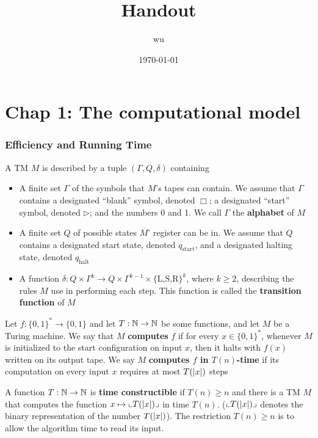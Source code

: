 \documentclass[11pt]{article}
\author{wu}
\date{\today}
\title{Handout}
\def \start {\text{start}}
\def \halt {\text{halt}}
\begin{document}
\maketitle
\tableofcontents

\section{Chap 1: The computational model}
\label{sec:org0fc5794}

\subsubsection{Efficiency and Running Time}
\label{sec:org3b71a53}
\begin{definition}[]
A TM \(M\) is described by a tuple \((\Gamma,Q,\delta)\) containing
\begin{itemize}
\item A finite set \(\Gamma\) of the symbols that \(M\)'s tapes can contain. We assume that \(\Gamma\) contains a
designated ``blank'' symbol, denoted \(\Box\); a designated ``start'' symbol, denoted \(\rhd\);
and the numbers 0 and 1. We call \(\Gamma\) the \textbf{alphabet} of \(M\)
\item A finite set \(Q\) of possible states \(M\)' register can be in. We assume that \(Q\) contains
a designated start state, denoted \(q_{\start}\), and a designated halting state, denoted \(q_{\halt}\)
\item A function \(\delta:Q\times\Gamma^k\to Q\times\Gamma^{k-1}\times\{\text{L,S,R}\}^k\),
where \(k\ge2\), describing the rules \(M\) use in performing each step. This function is
called the \textbf{transition function} of \(M\)
\end{itemize}
\end{definition}


\begin{definition}
Let \(f:\{0,1\}^*\to\{0,1\}\) and let \(T:\mathbb{N}\to\mathbb{N}\) be some functions, and let \(M\) be a Turing
machine. We say that \(M\) \textbf{computes} \(f\) if for every \(x\in\{0,1\}^*\), whenever \(M\) is
initialized to the start configuration on input \(x\), then it halts with \(f(x)\) written on
its output tape. We say \(M\) \textbf{computes \(f\) in \(T(n)\)-time} if its computation on every
input \(x\) requires at most \(T(\abs{x})\) steps
\end{definition}

A function \(T:\mathbb{N}\to\mathbb{N}\) is \textbf{time constructible} if \(T(n)\ge n\) and there is a TM \(M\) that
computes the function \(x\mapsto\lcorner{T(\abs{x})}\) in time \(T(n)\). (\(\lcorner{T(\abs{x})}\)
denotes the binary representation of the number \(T(\abs{x})\)). The restriction \(T(n)\ge n\) is
to allow the algorithm time to read its input.
\end{document}
